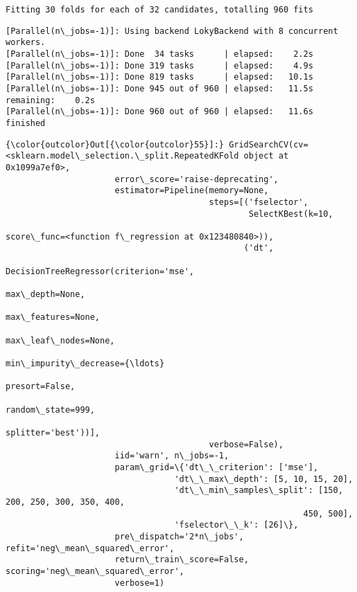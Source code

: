 \documentclass[11pt]{article}
\begin{document}
    \begin{Verbatim}[commandchars=\\\{\}]
Fitting 30 folds for each of 32 candidates, totalling 960 fits

    \end{Verbatim}

    \begin{Verbatim}[commandchars=\\\{\}]
[Parallel(n\_jobs=-1)]: Using backend LokyBackend with 8 concurrent workers.
[Parallel(n\_jobs=-1)]: Done  34 tasks      | elapsed:    2.2s
[Parallel(n\_jobs=-1)]: Done 319 tasks      | elapsed:    4.9s
[Parallel(n\_jobs=-1)]: Done 819 tasks      | elapsed:   10.1s
[Parallel(n\_jobs=-1)]: Done 945 out of 960 | elapsed:   11.5s remaining:    0.2s
[Parallel(n\_jobs=-1)]: Done 960 out of 960 | elapsed:   11.6s finished

    \end{Verbatim}

\begin{Verbatim}[commandchars=\\\{\}]
{\color{outcolor}Out[{\color{outcolor}55}]:} GridSearchCV(cv=<sklearn.model\_selection.\_split.RepeatedKFold object at 0x1099a7ef0>,
                      error\_score='raise-deprecating',
                      estimator=Pipeline(memory=None,
                                         steps=[('fselector',
                                                 SelectKBest(k=10,
                                                             score\_func=<function f\_regression at 0x123480840>)),
                                                ('dt',
                                                 DecisionTreeRegressor(criterion='mse',
                                                                       max\_depth=None,
                                                                       max\_features=None,
                                                                       max\_leaf\_nodes=None,
                                                                       min\_impurity\_decrease={\ldots}
                                                                       presort=False,
                                                                       random\_state=999,
                                                                       splitter='best'))],
                                         verbose=False),
                      iid='warn', n\_jobs=-1,
                      param\_grid=\{'dt\_\_criterion': ['mse'],
                                  'dt\_\_max\_depth': [5, 10, 15, 20],
                                  'dt\_\_min\_samples\_split': [150, 200, 250, 300, 350, 400,
                                                            450, 500],
                                  'fselector\_\_k': [26]\},
                      pre\_dispatch='2*n\_jobs', refit='neg\_mean\_squared\_error',
                      return\_train\_score=False, scoring='neg\_mean\_squared\_error',
                      verbose=1)
\end{Verbatim}
            
\end{document}
